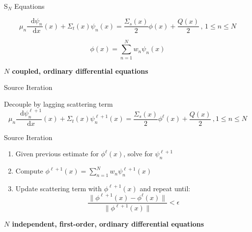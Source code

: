 \documentclass[10pt]{beamer}
\newcommand{\SN}{S$_N$\xspace}
\newcommand{\ud}{\mathop{}\!\mathrm{d}} %
\newcommand{\dderiv}[2]{\frac{\ud #1}{\ud #2}}
\begin{document}
\begin{frame}{\SN Equations}

    \begin{equation*}
        \mu_n \dderiv{\psi_n}{x}(x) + \Sigma_t(x) \psi_n(x) = 
        \frac{\Sigma_s(x)}{2} \phi(x) + \frac{Q(x)}{2} \,, \, 1 \leq n \leq N
    \end{equation*}

    \begin{equation*}
        \phi(x) = \sum_{n=1}^N w_n \psi_n(x)
    \end{equation*}

    \textbf{$N$ coupled, ordinary differential equations}

\end{frame}

\begin{frame}{Source Iteration}

    Decouple by lagging scattering term 
    \begin{equation*}
        \mu_n \dderiv{\psi_n^{\ell+1}}{x}(x) + \Sigma_t(x) \psi_n^{\ell+1}(x) = 
        \frac{\Sigma_s(x)}{2} \phi^{\ell}(x) + \frac{Q(x)}{2} \,, 1 \leq n \leq N        
    \end{equation*}

    \begin{exampleblock}{Source Iteration}
    \begin{enumerate}
        \item Given previous estimate for $\phi^{\ell}(x)$, solve for $\psi_n^{\ell+1}$

        \item Compute $\phi^{\ell+1}(x) = 
            \sum_{n=1}^N w_n \psi_n^{\ell+1}(x)$ 

        \item Update scattering term with $\phi^{\ell+1}(x)$ and repeat until: 
             \begin{equation*}
                \frac{\|\phi^{\ell+1}(x) - \phi^{\ell}(x)\|}{\|\phi^{\ell+1}(x)\|} < \epsilon 
             \end{equation*}

    \end{enumerate}
    \end{exampleblock}

    \textbf{$N$ independent, first-order, ordinary differential equations}

\end{frame}
\end{document}
